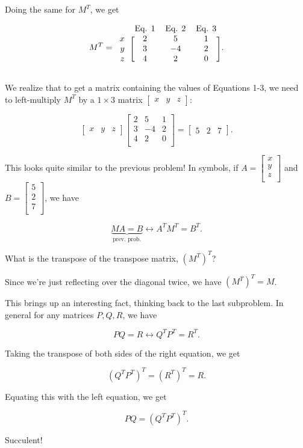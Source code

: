 \documentclass[../gatm_answers.tex]{subfiles}
\begin{document}
Doing the same for $M^T$, we get

$$M^T=\begin{blockarray}{rccc}
& \text{Eq. 1} & \text{Eq. 2} & \text{Eq. 3} \\
\begin{block}{r[ccc]}
x & 2 & 5 & 1 \\
y & 3 & -4 & 2 \\
z & 4 & 2 & 0 \\
\end{block}
\end{blockarray}.$$

We realize that to get a matrix containing the values of Equations 1-3, we need to left-multiply $M^T$ by a $1\times 3$ matrix $\begin{bmatrix} x & y & z \end{bmatrix}$:

$$\begin{bmatrix} x & y & z \end{bmatrix} \begin{bmatrix}
2 & 5 & 1 \\
3 & -4 & 2 \\
4 & 2 & 0 \\
\end{bmatrix} = \begin{bmatrix}5 & 2 & 7\end{bmatrix}.$$

This looks quite similar to the previous problem! In symbols, if $A = \begin{bmatrix} x \\ y \\ z \\ \end{bmatrix}$ and $B = \begin{bmatrix} 5 \\ 2 \\ 7 \\ \end{bmatrix}$, we have

$$\underbrace{MA=B}_\text{prev. prob.} \longleftrightarrow A^TM^T=B^T.$$

\begin{inner_problem}
\item What is the transpose of the transpose matrix, $(M^T)^T$?
\end{inner_problem}

Since we're just reflecting over the diagonal twice, we have $(M^T)^T=M$.

This brings up an interesting fact, thinking back to the last subproblem. In general for any matrices $P,Q,R$, we have

$$PQ=R \longleftrightarrow Q^TP^T=R^T.$$

Taking the transpose of both sides of the right equation, we get

$$(Q^TP^T)^T=(R^T)^T = R.$$

Equating this with the left equation, we get

$$PQ = (Q^TP^T)^T.$$

Succulent!
\end{document}
